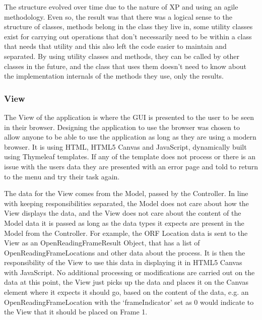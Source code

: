 The structure evolved over time due to the nature of XP and using an agile methodology. Even so, the result was that there was a logical sense to the structure of classes, methods belong in the class they live in, some utility classes exist for carrying out operations that don't necessarily need to be within a class that needs that utility and this also left the code easier to maintain and separated. By using utility classes and methods, they can be called by other classes in the future, and the class that uses them doesn't need to know about the implementation internals of the methods they use, only the results.

\subsubsection{View}
The View of the application is where the GUI is presented to the user to be seen in their browser. Designing the application to use the browser was chosen to allow anyone to be able to use the application as long as they are using a modern browser. It is using HTML, HTML5 Canvas and JavaScript, dynamically built using Thymeleaf templates. If any of the template does not process or there is an issue with the users data they are presented with an error page and told to return to the menu and try their task again.

The data for the View comes from the Model, passed by the Controller. In line with keeping responsibilities separated, the Model does not care about how the View displays the data, and the View does not care about the content of the Model data it is passed as long as the data types it expects are present in the Model from the Controller. For example, the ORF Location data is sent to the View as an OpenReadingFrameResult Object, that has a list of OpenReadingFrameLocations and other data about the process. It is then the responsibility of the View to use this data in displaying it in HTML5 Canvas with JavaScript. No additional processing or modifications are carried out on the data at this point, the View just picks up the data and places it on the Canvas element where it expects it should go, based on the content of the data, e.g. an OpenReadingFrameLocation with the `frameIndicator' set as 0 would indicate to the View that it should be placed on Frame 1.

